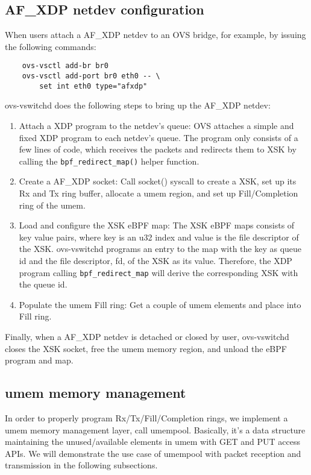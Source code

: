 \documentclass[10pt]{sigplanconf}
\begin{document}
\subsection{AF\_XDP netdev configuration}
When users attach a AF\_XDP netdev to an OVS bridge, for example, by
issuing the following commands:
{\small
\begin{verbatim}
    ovs-vsctl add-br br0
    ovs-vsctl add-port br0 eth0 -- \
        set int eth0 type="afxdp"
\end{verbatim}
}
ovs-vswitchd does the following steps to bring up the
AF\_XDP netdev:
\begin{enumerate}
\item Attach a XDP program to the netdev's queue:
OVS attaches a simple and fixed XDP program to each netdev's queue.
The program only consists of a few lines of code, which receives the
packets and redirects them to XSK by calling the \texttt{bpf\_redirect\_map()}
helper function.

\item Create a AF\_XDP socket:
Call socket() syscall to create a XSK,
set up its Rx and Tx ring buffer, allocate a umem region,
and set up Fill/Completion ring of the umem.

\item Load and configure the XSK eBPF map:
The XSK eBPF maps consists of key value pairs, where key is an u32 index and
value is the file descriptor of the XSK.  ovs-vswitchd programs an entry to
the map with the key as queue id and the file descriptor, fd, of the XSK as
its value.
Therefore, the XDP program calling \texttt{bpf\_redirect\_map} will derive
the corresponding XSK with the queue id.

\item Populate the umem Fill ring: Get a couple of umem elements and place into Fill ring.
\end{enumerate}
Finally, when a AF\_XDP netdev is detached or closed by user,
ovs-vswitchd closes the XSK socket, free the umem memory region, and
unload the eBPF program and map.

\subsection{umem memory management}
In order to properly program Rx/Tx/Fill/Completion rings, we implement a
umem memory management layer, call umempool. Basically, it's a data structure
maintaining the unused/available elements in umem with GET and PUT access
APIs. We will demonstrate the use case of umempool with packet reception and
transmission in the following subsections.
\end{document}
